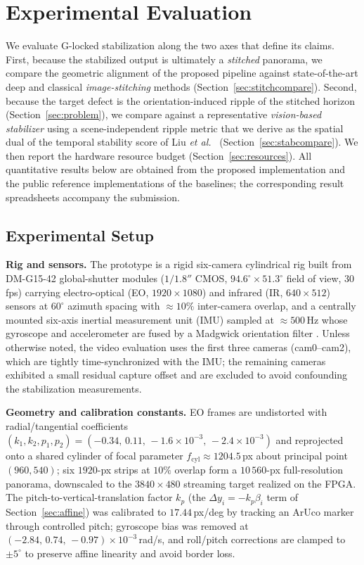 \documentclass[journal]{IEEEtran}
\newcommand{\etal}{\textit{et al.}}
\begin{document}
\section{Experimental Evaluation}
\label{sec:experiments}
We evaluate G-locked stabilization along the two axes that define its claims. First, because the stabilized output is ultimately a \emph{stitched} panorama, we compare the geometric alignment of the proposed pipeline against state-of-the-art deep and classical \emph{image-stitching} methods (Section~\ref{sec:stitchcompare}). Second, because the target defect is the orientation-induced ripple of the stitched horizon (Section~\ref{sec:problem}), we compare against a representative \emph{vision-based stabilizer} using a scene-independent ripple metric that we derive as the spatial dual of the temporal stability score of Liu \etal~\cite{liu2013bundled} (Section~\ref{sec:stabcompare}). We then report the hardware resource budget (Section~\ref{sec:resources}). All quantitative results below are obtained from the proposed implementation and the public reference implementations of the baselines; the corresponding result spreadsheets accompany the submission.

\subsection{Experimental Setup}
\label{sec:setup}
\textbf{Rig and sensors.} The prototype is a rigid six-camera cylindrical rig built from DM-G15-42 global-shutter modules ($1/1.8''$ CMOS, $94.6^\circ{\times}51.3^\circ$ field of view, $30$\,fps) carrying electro-optical (EO, $1920\times1080$) and infrared (IR, $640\times512$) sensors at $60^\circ$ azimuth spacing with ${\approx}10\%$ inter-camera overlap, and a centrally mounted six-axis inertial measurement unit (IMU) sampled at ${\approx}500$\,Hz whose gyroscope and accelerometer are fused by a Madgwick orientation filter \cite{madgwick2010filter}. Unless otherwise noted, the video evaluation uses the first three cameras (cam0--cam2), which are tightly time-synchronized with the IMU; the remaining cameras exhibited a small residual capture offset and are excluded to avoid confounding the stabilization measurements.

\textbf{Geometry and calibration constants.} EO frames are undistorted with radial/tangential coefficients $(k_1,k_2,p_1,p_2)=(-0.34,\,0.11,\,-1.6{\times}10^{-3},\,-2.4{\times}10^{-3})$ and reprojected onto a shared cylinder of focal parameter $f_{\mathrm{cyl}}\approx1204.5$\,px about principal point $(960,540)$; six $1920$-px strips at $10\%$ overlap form a $10\,560$-px full-resolution panorama, downscaled to the $3840\times480$ streaming target realized on the FPGA. The pitch-to-vertical-translation factor $k_p$ (the $\Delta y_i=-k_p\beta_i$ term of Section~\ref{sec:affine}) was calibrated to $17.44$\,px/deg by tracking an ArUco marker through controlled pitch; gyroscope bias was removed at $(-2.84,\,0.74,\,-0.97){\times}10^{-3}$\,rad/s, and roll/pitch corrections are clamped to $\pm5^\circ$ to preserve affine linearity and avoid border loss.
\end{document}
